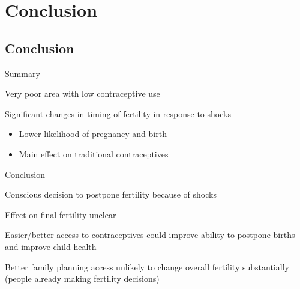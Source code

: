 \documentclass[red]{beamer}
\begin{document}

\section{Conclusion}

\subsection{Conclusion}

\begin{frame}{Summary}

Very poor area with low contraceptive use

\bigskip
Significant changes in timing of fertility in response to shocks
\begin{itemize}
\item Lower likelihood of pregnancy and birth
\item Main effect on traditional contraceptives
\end{itemize}


% 

% 
% 
\end{frame}

\begin{frame}{Conclusion}


Conscious decision to postpone fertility because of shocks

\bigskip
Effect on final fertility unclear

\bigskip
Easier/better access to contraceptives could improve ability to postpone births and 
improve child health

\bigskip
Better family planning access unlikely to change overall fertility substantially 
(people already making fertility decisions)

\end{frame}

% 
% 



\end{document}
